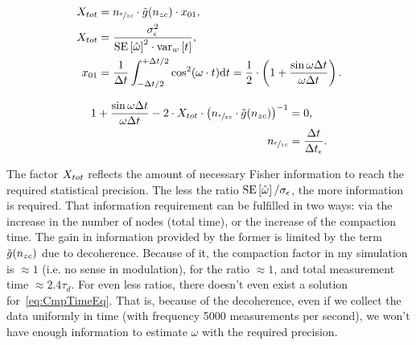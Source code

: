 \documentclass{article}
\begin{document}
%

\newcommand{\dt}{\Delta t}
\begin{align*}
	X_{tot}	&= \Nmnd\cdot \tilde{g}(\Nnd)\cdot x_{01}, \\
	X_{tot}	&= \stat, \\
	x_{01}	&= \frac{1}{\dt}\int_{-\dt/2}^{+\dt/2}\cos^2(\omega\cdot t)\td t = \frac12\cdot \bkt{1 + \frac{\sin\omega\dt}{\omega\dt}}.
\end{align*}

\begin{align}\label{eq:CmpTimeEq}
	1 + \frac{\sin\omega\dt}{\omega\dt} - 2\cdot \stat* \cdot \bkt{\Nmnd\cdot \tilde{g}(\Nnd)}^{-1} &=0, \\
	\Nmnd	&= \frac{\dt}{\dt_{\meas}}. \notag
\end{align}

The factor $\stat*$ reflects the amount of necessary Fisher information to reach the required statistical precision. The less the ratio $\SE{\hat{\omega}}/\SD{\meas}$, the more information is required. That information requirement can be fulfilled in two ways: via the increase in the number of nodes (total time), or the increase of the compaction time. The gain in information provided by the former is limited by the term $\tilde{g}(n_{zc})$ due to decoherence. Because of it, the compaction factor in my simulation is $\approx 1$ (i.e. no sense in modulation), for the ratio $\approx 1$, and total measurement time $\approx 2.4\tau_d$. For even less ratios, there doesn't even exist a solution for~\eqref{eq:CmpTimeEq}. That is, because of the decoherence, even if we collect the data uniformly in time (with frequency 5000 measurements per second), we won't have enough information to estimate $\omega$ with the required precision.
\end{document}
